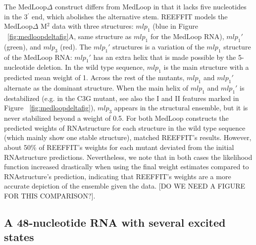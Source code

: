 \documentclass[12pt]{article}
\begin{document}
The MedLoop$\Delta$ construct differs from MedLoop in that it lacks five nucleotides in the 3$^{\prime}$ end, which abolishes the alternative stem. 
REEFFIT models the MedLoop$\Delta$ M$^2$ data with three structures: $mlp_1$ (blue in Figure ~\ref{fig:medloopdeltafig}A, same structure as $mlp_1$ for the MedLoop RNA), $mlp_1'$ (green), and $mlp_3$ (red). 
The $mlp_1'$ structures is a variation  of the $mlp_1$ structure of the MedLoop RNA: $mlp_1'$ has an extra helix that is made possible by the 5-nucleotide deletion. 
In the wild type sequence, $mlp_1$ is the main structure with a predicted mean weight of 1. 
Across the rest of the mutants, $mlp_1$ and $mlp_1'$ alternate as the dominant structure.
When the main helix of $mlp_1$ and $mlp_1'$ is destabilized (e.g. in the C3G mutant, see also the I and II features marked in Figure ~\ref{fig:medloopdeltafig}), $mlp_3$ appears in the structural ensemble, but it is never stabilized beyond a weight of 0.5. 
For both MedLoop constructs the predicted weights of RNAstructure for each structure in the wild type sequence (which mainly show one stable structure), matched REEFFIT's results. However, about 50\% of REEFFIT's weights for each mutant deviated from the initial RNAstructure predictions. Nevertheless, we note that in both cases the likelihood function increased drastically when using the final weight estimates compared to RNAstructure's prediction, indicating that REEFFIT's weights are a more accurate depiction of the ensemble given the data. [DO WE NEED A FIGURE FOR THIS COMPARISON?].

\subsection{A 48-nucleotide RNA with several excited states}
\end{document}
